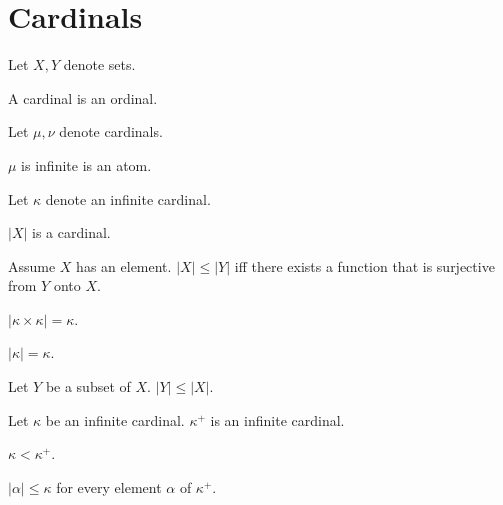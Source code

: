 \documentclass[english]{article}
\begin{document}
  \section{Cardinals}

  \begin{forthel}
    Let $X, Y$ denote sets.

    \begin{signature}
      A cardinal is an ordinal.
    \end{signature}

    Let $\mu, \nu$ denote cardinals.

    \begin{signature}
      $\mu$ is infinite is an atom.
    \end{signature}

    Let $\kappa$ denote an infinite cardinal.

    \begin{signature}\label{Cardinality}
      $|X|$ is a cardinal.
    \end{signature}

    \begin{axiom}\label{existence_of_surjection}
      Assume $X$ has an element.
      $|X| \leq |Y|$ iff there exists a function that is surjective from $Y$ onto $X$.
    \end{axiom}

    \begin{axiom}[Hessenberg]
      $|\kappa \times \kappa| = \kappa$.
    \end{axiom}

    \begin{axiom}
      $|\kappa| = \kappa$.
    \end{axiom}

    \begin{axiom}
      Let $Y$ be a subset of $X$.
      $|Y| \leq |X|$.
    \end{axiom}

    \begin{signature}
      Let $\kappa$ be an infinite cardinal.
      $\kappa^{+}$ is an infinite cardinal.
    \end{signature}

    \begin{axiom}
      $\kappa < \kappa^{+}$.
    \end{axiom}

    \begin{axiom}
      $|\alpha| \leq \kappa$ for every element $\alpha$ of $\kappa^{+}$.
    \end{axiom}


\end{forthel}
\end{document}
